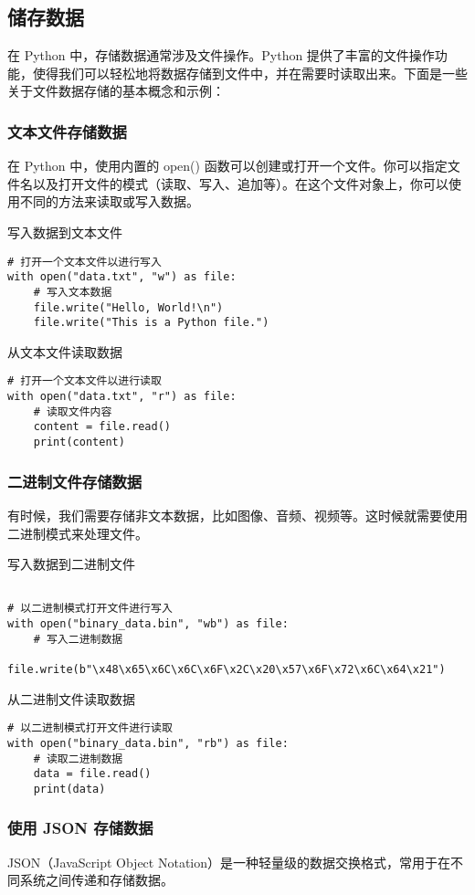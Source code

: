 \documentclass{article}
\begin{document}
\subsection{储存数据}
在 Python 中，存储数据通常涉及文件操作。Python 提供了丰富的文件操作功能，使得我们可以轻松地将数据存储到文件中，并在需要时读取出来。下面是一些关于文件数据存储的基本概念和示例：

\subsubsection{文本文件存储数据}
在 Python 中，使用内置的 open() 函数可以创建或打开一个文件。你可以指定文件名以及打开文件的模式（读取、写入、追加等）。在这个文件对象上，你可以使用不同的方法来读取或写入数据。

写入数据到文本文件
\begin{lstlisting}[caption={示例Python代码}]
# 打开一个文本文件以进行写入
with open("data.txt", "w") as file:
    # 写入文本数据
    file.write("Hello, World!\n")
    file.write("This is a Python file.")
\end{lstlisting}

从文本文件读取数据
\begin{lstlisting}[caption={示例Python代码}]
# 打开一个文本文件以进行读取
with open("data.txt", "r") as file:
    # 读取文件内容
    content = file.read()
    print(content)
\end{lstlisting}
\subsubsection{二进制文件存储数据}
有时候，我们需要存储非文本数据，比如图像、音频、视频等。这时候就需要使用二进制模式来处理文件。

写入数据到二进制文件
\begin{lstlisting}[caption={示例Python代码}]

# 以二进制模式打开文件进行写入
with open("binary_data.bin", "wb") as file:
    # 写入二进制数据
    file.write(b"\x48\x65\x6C\x6C\x6F\x2C\x20\x57\x6F\x72\x6C\x64\x21")
\end{lstlisting}
从二进制文件读取数据
\begin{lstlisting}[caption={示例Python代码}]
# 以二进制模式打开文件进行读取
with open("binary_data.bin", "rb") as file:
    # 读取二进制数据
    data = file.read()
    print(data)
\end{lstlisting}    
\subsubsection{使用 JSON 存储数据}
JSON（JavaScript Object Notation）是一种轻量级的数据交换格式，常用于在不同系统之间传递和存储数据。
\end{document}
